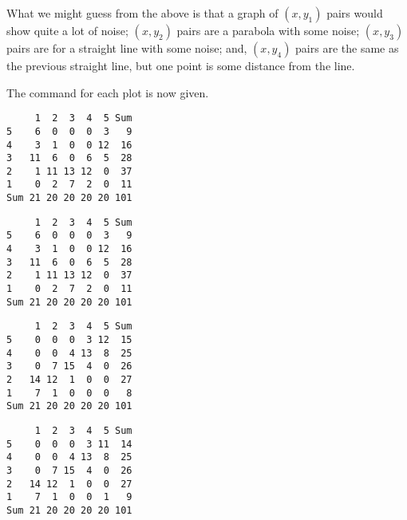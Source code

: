 What we might guess from the above is that a graph of $(x,y_1)$ pairs would show quite a lot of noise; $(x,y_2)$ pairs are a parabola with some noise; $(x,y_3)$ pairs are for a straight line with some noise; and, $(x,y_4)$ pairs are the same as the previous straight line, but one point is some distance from the line. 
 
The  command for each plot is now given. 
\begin{knitrout}
\color{fgcolor}\begin{kframe}
\begin{alltt}
\hlstd{> } \hlstd{=}\hlstd{(}\hlstd{,}\hlstd{))}
\end{alltt}
\begin{verbatim}
     1  2  3  4  5 Sum
5    6  0  0  0  3   9
4    3  1  0  0 12  16
3   11  6  0  6  5  28
2    1 11 13 12  0  37
1    0  2  7  2  0  11
Sum 21 20 20 20 20 101
\end{verbatim}
\begin{alltt}
\hlstd{> } \hlstd{=}\hlstd{(}\hlstd{,}\hlstd{))}
\end{alltt}
\begin{verbatim}
     1  2  3  4  5 Sum
5    6  0  0  0  3   9
4    3  1  0  0 12  16
3   11  6  0  6  5  28
2    1 11 13 12  0  37
1    0  2  7  2  0  11
Sum 21 20 20 20 20 101
\end{verbatim}
\begin{alltt}
\hlstd{> } \hlstd{=}\hlstd{(}\hlstd{,}\hlstd{))}
\end{alltt}
\begin{verbatim}
     1  2  3  4  5 Sum
5    0  0  0  3 12  15
4    0  0  4 13  8  25
3    0  7 15  4  0  26
2   14 12  1  0  0  27
1    7  1  0  0  0   8
Sum 21 20 20 20 20 101
\end{verbatim}
\begin{alltt}
\hlstd{> } \hlstd{=}\hlstd{(}\hlstd{,}\hlstd{))}
\end{alltt}
\begin{verbatim}
     1  2  3  4  5 Sum
5    0  0  0  3 11  14
4    0  0  4 13  8  25
3    0  7 15  4  0  26
2   14 12  1  0  0  27
1    7  1  0  0  1   9
Sum 21 20 20 20 20 101
\end{verbatim}
\end{kframe}
\end{knitrout}
 
